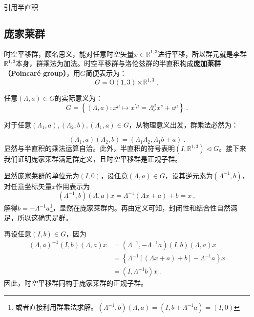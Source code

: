 

\begin{issues}
\issueTODO 引用半直积
\end{issues}


\subsection{庞家莱群}
时空平移群，顾名思义，能对任意时空矢量$x\in \mathbb R^{1,3} $进行平移，所以群元就是李群$\mathbb R^{1,3}$本身，群乘法为加法。时空平移群与洛伦兹群的半直积构成\textbf{庞加莱群（Poincaré group）}，用$G$简便表示为：
\begin{equation}
G= \mathrm{O}(1,3) \ltimes\mathbb{R}^{1,3}~,
\end{equation}

任意$(\Lambda,a)\in G$的实际意义为：
\begin{equation}
G=\left\{(\Lambda, a): x^{\mu} \mapsto x^{\prime \mu}=\Lambda_{\nu}^{\mu} x^{\nu}+a^{\mu}\right\}~.
\end{equation}


对于任意$(\Lambda_1,a),(\Lambda_2,b),(\Lambda_1,a)\in G$，从物理意义出发，群乘法必然为：

\begin{equation}
(\Lambda_1,a)(\Lambda_2,b)=(\Lambda_1\Lambda_2,\Lambda_1b+a)~.
\end{equation}
显然与半直积的乘法运算自洽。此外，半直积的符号表明$(I,\mathbb R^{1,3})\vartriangleleft G$。接下来我们证明庞家莱群满足群定义，且时空平移群是正规子群。

显然庞家莱群的单位元为$(I,0)$，设任意$(\Lambda,a)\in G$，设其逆元素为$(\Lambda^{-1},b)$，对任意坐标矢量$x$作用表示为
\begin{equation}
(\Lambda^{-1},b)(\Lambda,a)x=\Lambda^{-1}(\Lambda x+a)+b=x~,
\end{equation}
解得$b=-\Lambda^{-1} a$\footnote{或者直接利用群乘法求解。$(\Lambda^{-1},b)(\Lambda,a)=(I,b+\Lambda^{-1}a)=(I,0)$}，显然在庞家莱群内。再由定义可知，封闭性和结合性自然满足，所以这确实是群。

再设任意$(I,b)\in G$，因为
\begin{equation}
\begin{aligned}
(\Lambda,a)^{-1}(I,b)(\Lambda,a)x&=(\Lambda^{-1},-\Lambda^{-1}a)(I,b)(\Lambda,a)x\\
&=\left\{\Lambda^{-1}\left [\left(\Lambda x+a \right)+b\right]-\Lambda^{-1}a\right\}x\\
&=(I,\Lambda^{-1}b)x~.
\end{aligned}
\end{equation}
因此，时空平移群同构于庞家莱群的正规子群。

